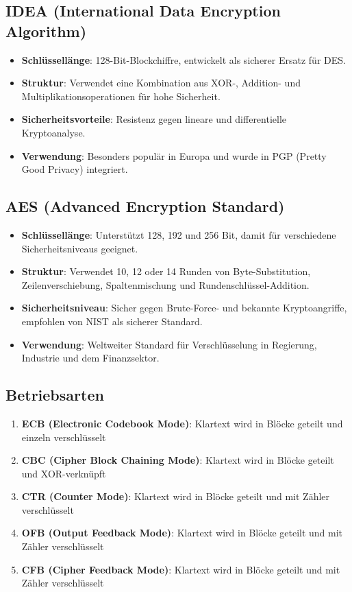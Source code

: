 \documentclass{article}
\begin{document}
\subsection{IDEA (International Data Encryption Algorithm)}
\begin{itemize}
  \item \textbf{Schlüssellänge}: 128-Bit-Blockchiffre, entwickelt als sicherer Ersatz für DES.
  \item \textbf{Struktur}: Verwendet eine Kombination aus XOR-, Addition- und Multiplikationsoperationen für hohe Sicherheit.
  \item \textbf{Sicherheitsvorteile}: Resistenz gegen lineare und differentielle Kryptoanalyse.
  \item \textbf{Verwendung}: Besonders populär in Europa und wurde in PGP (Pretty Good Privacy) integriert.
\end{itemize}

\subsection{AES (Advanced Encryption Standard)}
\begin{itemize}
  \item \textbf{Schlüssellänge}: Unterstützt 128, 192 und 256 Bit, damit für verschiedene Sicherheitsniveaus geeignet.
  \item \textbf{Struktur}: Verwendet 10, 12 oder 14 Runden von Byte-Substitution, Zeilenverschiebung, Spaltenmischung und Rundenschlüssel-Addition.
  \item \textbf{Sicherheitsniveau}: Sicher gegen Brute-Force- und bekannte Kryptoangriffe, empfohlen von NIST als sicherer Standard.
  \item \textbf{Verwendung}: Weltweiter Standard für Verschlüsselung in Regierung, Industrie und dem Finanzsektor.
\end{itemize}

\subsection{Betriebsarten}

\begin{enumerate}
  \item \textbf{ECB (Electronic Codebook Mode)}: Klartext wird in Blöcke geteilt und einzeln verschlüsselt
  \item \textbf{CBC (Cipher Block Chaining Mode)}: Klartext wird in Blöcke geteilt und XOR-verknüpft
  \item \textbf{CTR (Counter Mode)}: Klartext wird in Blöcke geteilt und mit Zähler verschlüsselt
  \item \textbf{OFB (Output Feedback Mode)}: Klartext wird in Blöcke geteilt und mit Zähler verschlüsselt
  \item \textbf{CFB (Cipher Feedback Mode)}: Klartext wird in Blöcke geteilt und mit Zähler verschlüsselt
\end{enumerate}
\end{document}
